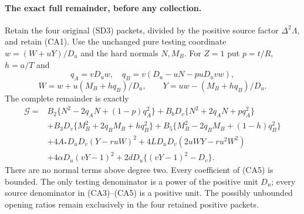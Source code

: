 \paragraph{The exact full remainder, before any collection.}
Retain the four original (SD3) packets, divided by the positive source
factor $\Delta^2\Lambda$, and retain (CA1). Use the unchanged pure
testing coordinate $w=(W+uY)/D_u$ and the hard normals $N,M_B$.
For $Z=1$ put $p=t/R$, $h=a/T$ and
\[
 q_A=vD_uw,\quad q_B=v(D_u-uN-puD_uv w),
\]
\[
 W=w+u(M_B+hq_B)/D_u,\qquad
 Y=uw-(M_B+hq_B)/D_u.
\]
The complete remainder is exactly
\begin{align*}
\mathscr G={}&B_2\{N^2-2q_AN+(1-p)q_A^2\}
 +B_bD_v\{N^2+2q_AN+pq_A^2\}\\
&+B_3D_v\{M_B^2+2q_BM_B+hq_B^2\}
 +B_5\{M_B^2-2q_BM_B+(1-h)q_B^2\}\\
&+4A_*D_uD_v(Y-r uW)^2
 +4LD_uD_v(2uWY-r u^2W^2)\\
&+4\alpha D_u(vY-1)^2
 +2dD_u\{(vY-1)^2-D_v\}.                         \tag{CA5}
\end{align*}
There are no normal terms above degree two. Every coefficient of
(CA5) is bounded. The only testing denominator is a power of the
positive unit $D_u$; every source denominator in (CA3)--(CA5) is a
positive unit. The possibly unbounded opening ratios remain exclusively
in the four retained positive packets.

